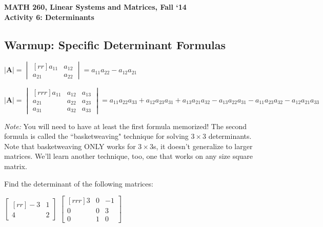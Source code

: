 \documentclass{article}
\begin{document}
\begin{flushleft}
	\bfseries{MATH 260, Linear Systems and Matrices, Fall `14}\\
	\bfseries{Activity 6:  Determinants}\\
\end{flushleft}
\begin{flushleft}

\section*{Warmup: Specific Determinant Formulas}

$|\textbf{A}| = \begin{vmatrix}[rr] a_{11} & a_{12} \\ a_{21} & a_{22} \end{vmatrix} = a_{11} a_{22} - a_{12} a_{21}$ 

\vspace{0.2in}

$|\textbf{A}| = \begin{vmatrix}[rrr] a_{11} & a_{12} & a_{13} \\ a_{21} & a_{22} & a_{23} \\ a_{31} & a_{32} & a_{33} \end{vmatrix} = a_{11} a_{22} a_{33} +  a_{12} a_{23} a_{31} + a_{13} a_{21} a_{32} - a_{13} a_{22} a_{31} - a_{11} a_{23} a_{32} - a_{12} a_{21} a_{33} $

\vspace{0.2in}

\textit{Note:} You will need to have at least the first formula memorized!  The second formula is called the ``basketweaving" technique for solving $3 \times 3$ determinants.  Note that basketweaving ONLY works for $3 \times 3$s, it doesn't generalize to larger matrices.  We'll learn another technique, too, one that works on any size square matrix.

\vspace{0.2in}


Find the determinant of the following matrices:

\begin{center}
$\begin{bmatrix}[rr]
-3 & 1   \\
4 & 2   
\end{bmatrix}
$
\hspace{1in}
$\begin{bmatrix}[rrr]
3 & 0 & -1\\
0 & 0 &  3 \\
0 & 1 & 0
\end{bmatrix}
$
\end{center}


\end{flushleft}
\end{document}
